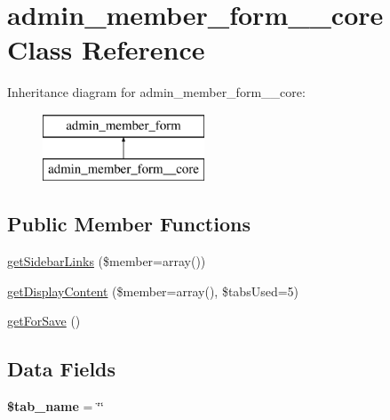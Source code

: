 \hypertarget{classadmin__member__form____core}{\section{admin\-\_\-member\-\_\-form\-\_\-\-\_\-core Class Reference}
\label{classadmin__member__form____core}
}
Inheritance diagram for admin\-\_\-member\-\_\-form\-\_\-\-\_\-core\-:\begin{figure}[H]
\begin{center}
\leavevmode
\includegraphics[height=2.000000cm]{classadmin__member__form____core}
\end{center}
\end{figure}
\subsection*{Public Member Functions}
\begin{DoxyCompactItemize}
\item 
\hyperlink{classadmin__member__form____core_aa06c25b69a518bbb6eaaaf6a84047f04}{get\-Sidebar\-Links} (\$member=array())
\item 
\hyperlink{classadmin__member__form____core_af3da842ede1e6d212629fd0eda2bfbcc}{get\-Display\-Content} (\$member=array(), \$tabs\-Used=5)
\item 
\hyperlink{classadmin__member__form____core_aa584200e117d7f02d4fabc05b109e51f}{get\-For\-Save} ()
\end{DoxyCompactItemize}
\subsection*{Data Fields}
\begin{DoxyCompactItemize}
\item 
\hypertarget{classadmin__member__form____core_a924f0502d852ff2259cef00e4fa12d94}{{\bfseries \$tab\-\_\-name} = \char`\"{}\char`\"{}}\label{classadmin__member__form____core_a924f0502d852ff2259cef00e4fa12d94}

\end{DoxyCompactItemize}


